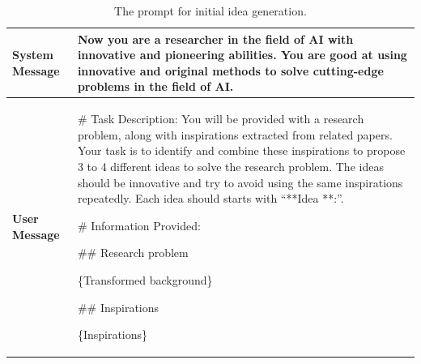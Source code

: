 \documentclass{article}
\theoremstyle{plain}
\theoremstyle{definition}
\theoremstyle{remark}
\begin{document}
\begin{table}[t]
	\centering  %
	\caption{The prompt for initial idea generation.}  %
	\label{tab:iig}  %
	\begin{tabular}{l | m{}}  
		\toprule  %
            \textbf{System Message} & Now you are a researcher in the field of AI with innovative and pioneering abilities. You are good at using innovative and original methods to solve cutting-edge problems in the field of AI. \\
            \midrule
            \textbf{User Message} & \# Task Description:
You will be provided with a research problem, along with inspirations extracted from related papers. Your task is to identify and combine these inspirations to propose 3 to 4 different ideas to solve the research problem. The ideas should be innovative and try to avoid using the same inspirations repeatedly. Each idea should starts with ``**Idea **:''.

\# Information Provided:

\#\# Research problem

\{Transformed background\}

\#\# Inspirations

\{Inspirations\}
\\
		\bottomrule
	\end{tabular}
\end{table}
\end{document}
